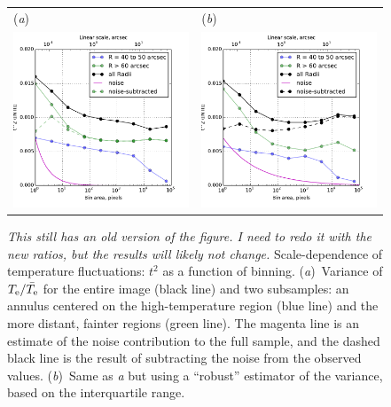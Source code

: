 \documentclass[preprint]{aastex}
\begin{document}
\begin{figure}
  \centering

  \begin{tabular}{ll}
    (\textit{a}) & (\textit{b}) \\
    \includegraphics[width=0.45\linewidth]{Tsq-nii-vs-binning-normal} &
    \includegraphics[width=0.45\linewidth]{Tsq-nii-vs-binning-robust}
  \end{tabular}
  \caption{\textit{This still has an old version of the figure.  I
      need to redo it with the new ratios, but the results will likely
      not change.}  Scale-dependence of temperature fluctuations:
    \(t^2\) as a function of binning. (\textit{a})~Variance of
    \(T_{\mathrm{e}}/\bar{T_{\mathrm{e}}}\) for the entire image (black line) and two
    subsamples: an annulus centered on the high-temperature region
    (blue line) and the more distant, fainter regions (green line).
    The magenta line is an estimate of the noise contribution to the
    full sample, and the dashed black line is the result of
    subtracting the noise from the observed values.  (\textit{b})~Same
    as \textit{a} but using a ``robust'' estimator of the variance,
    based on the interquartile range.}
  \label{fig:tsq-nii-vs-binning}
\end{figure}






\end{document}
